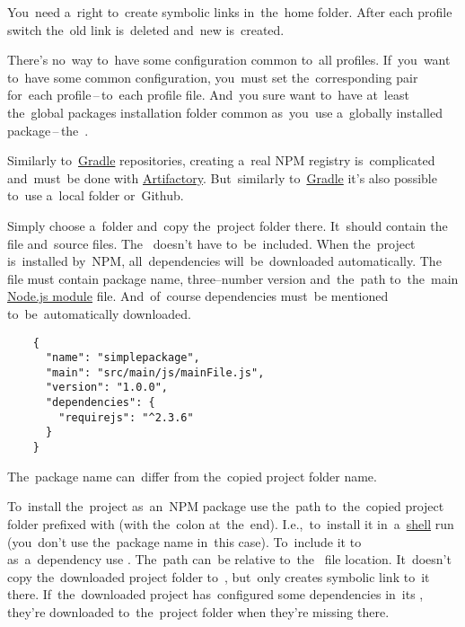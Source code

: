 \warning You~need a~right to~create symbolic links in~the~home folder.
After each profile switch the~old  link is~deleted and~new is~created.

\warning There's no~way to~have some configuration common to~all profiles.
If~you~want to~have some common configuration, you~must set the~corresponding  pair for~each profile\,--\,to~each profile file.
And~you sure want to~have at~least the~global packages installation folder common as~you~use a~globally installed package\,--\,the~.

Similarly to~\hyperref[gradle]{Gradle} repositories, creating a~real NPM registry is~complicated and~must~be done with \href{https://jfrog.com/artifactory/}{Artifactory}.
But~similarly to~\hyperref[gradle]{Gradle} it's also possible to~use a~local folder or~Github.

\label{npmpublishlocal}
Simply choose a~folder and~copy the~project folder there.
It~should contain the~ file and~source files.
The~ doesn't have to~be~included. When the~project is~installed by~NPM, all~dependencies will~be~downloaded automatically.
The~ file must contain package name, three--number version and~the~path to~the~main \hyperref[nodejsmodule]{Node.js module} file.
And~of~course dependencies must~be mentioned to~be~automatically downloaded.

\begin{lstlisting}
    {
      "name": "simplepackage",
      "main": "src/main/js/mainFile.js",
      "version": "1.0.0",
      "dependencies": {
        "requirejs": "^2.3.6"
      }
    }
\end{lstlisting}

\note The~package name can~differ from the~copied project folder name.
\newline

\noindent To~install the~project as~an~NPM package use the~path to~the~copied project folder prefixed with  (with the~colon at~the~end).
I.e.,~to~install it in~a~\hyperref[shellcligui]{shell} run  (you~don't use the~package name in~this case).
To~include it to~ as~a~dependency use .
The~path can~be relative to~the~ file location.
It~doesn't copy the~downloaded project folder to~, but~only creates symbolic link to~it there.
If~the~downloaded project has~configured some dependencies in~its , they're downloaded to~the~project folder when they're missing there.

